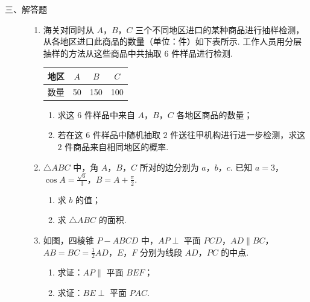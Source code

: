 \begin{description}

    \item[三、解答题]

    \begin{enumerate}[leftmargin=5pt]

      \addtocounter{enumi}{+15}

        \item 海关对同时从 \(A\)，\(B\)，\(C\) 三个不同地区进口的某种商品进行抽样检测，从各地区进口此商品的数量（单位：\(\text{件}\)）如下表所示. 工作人员用分层抽样的方法从这些商品中共抽取 \(6\text{ 件}\)样品进行检测.

\begin{center}
\begin{tabular}{c|c|c|c}
\hline
地区 & \(A\) & \(B\) & \(C\) \\
\hline
数量 & 50 & 150 & 100 \\
\hline
\end{tabular}
\end{center}

\begin{enumerate}
\item 求这 \(6\text{ 件}\)样品中来自 \(A\)，\(B\)，\(C\) 各地区商品的数量；
\item 若在这 \(6\text{ 件}\)样品中随机抽取 \(2\text{ 件}\)送往甲机构进行进一步检测，求这 \(2\text{ 件}\)商品来自相同地区的概率.
\end{enumerate}

        \item \(\triangle ABC\) 中，角 \(A\)，\(B\)，\(C\) 所对的边分别为 \(a\)，\(b\)，\(c\). 已知 \(a = 3\)，\(\cos A = \frac{\sqrt{6}}{3}\)，\(B = A + \frac{\pi}{2}\).

\begin{enumerate}
\item 求 \(b\) 的值；
\item 求 \(\triangle ABC\) 的面积.
\end{enumerate}

        \item 如图，四棱锥 \(P - ABCD\) 中，\(AP \perp\) 平面 \(PCD\)，\(AD \parallel BC\)，\(AB = BC = \frac{1}{2} AD\)，\(E\)，\(F\) 分别为线段 \(AD\)，\(PC\) 的中点.

\begin{enumerate}
\item 求证：\(AP \parallel\) 平面 \(BEF\)；
\item 求证：\(BE \perp\) 平面 \(PAC\).
\end{enumerate}


\end{enumerate}
\end{description}
